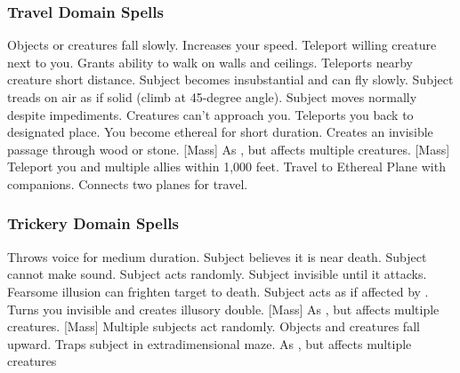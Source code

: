 \subsubsection{Travel Domain Spells}

\begin{spelllist}
     Objects or creatures fall slowly.
     Increases your speed.
     Teleport willing creature next to you.
     Grants ability to walk on walls and ceilings.
     Teleports nearby creature short distance.
     Subject becomes insubstantial and can fly slowly.
     Subject treads on air as if solid (climb at 45-degree angle).
     Subject moves normally despite impediments.
    \spellhead[5]{}
    \spellhead[5]{}
     Creatures can't approach you.
     Teleports you back to designated place.
     You become ethereal for short duration.
     Creates an invisible passage through wood or stone.
    [Mass] As , but affects multiple creatures.
    [Mass] Teleport you and multiple allies within 1,000 feet.
     Travel to Ethereal Plane with companions.
     Connects two planes for travel.
\end{spelllist}

\subsubsection{Trickery Domain Spells}

\begin{spelllist}
    \spellhead[1]{}
     Throws voice for medium duration.
     Subject believes it is near death.
     Subject cannot make sound.
     Subject acts randomly.
     Subject invisible until it attacks.
    \spellhead[4]{}
     Fearsome illusion can frighten target to death.
    \spellhead[5]{}
     Subject acts as if affected by .
     Turns you invisible and creates illusory double.
    \spellhead[6]{}
    [Mass] As , but affects multiple creatures.
    [Mass] Multiple subjects act randomly.
    \spellhead[8]{}
     Objects and creatures fall upward.
     Traps subject in extradimensional maze.
     As , but affects multiple creatures
\end{spelllist}

